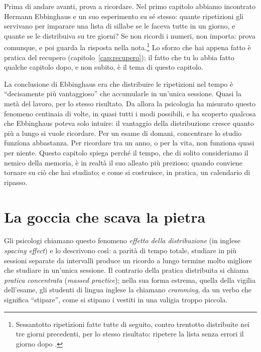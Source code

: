 Prima di andare avanti, prova a ricordare. Nel primo capitolo abbiamo
incontrato Hermann Ebbinghaus e un suo esperimento su sé stesso: quante
ripetizioni gli servivano per imparare una lista di sillabe se le faceva
tutte in un giorno, e quante se le distribuiva su tre giorni? Se non
ricordi i numeri, non importa: prova comunque, e poi guarda la
risposta nella nota.\footnote{Sessantotto ripetizioni fatte tutte di
seguito, contro trentotto distribuite nei tre giorni precedenti, per lo
stesso risultato: ripetere la lista senza errori il giorno dopo
\parencite{ebbinghaus1885}.} Lo sforzo che hai appena fatto è pratica
del recupero (capitolo~\ref{cap:recupero}); il fatto che tu lo abbia
fatto qualche capitolo dopo, e non subito, è il tema di questo
capitolo.

La conclusione di Ebbinghaus era che distribuire le ripetizioni nel
tempo è \enquote{decisamente più vantaggioso} che accumularle in
un'unica sessione. Quasi la metà del lavoro, per lo stesso risultato.
Da allora la psicologia ha misurato questo fenomeno centinaia di volte,
in quasi tutti i modi possibili, e ha scoperto qualcosa che Ebbinghaus
poteva solo intuire: il vantaggio della distribuzione cresce quanto più
a lungo si vuole ricordare. Per un esame di domani, concentrare lo
studio funziona abbastanza. Per ricordare tra un anno, o per la vita,
non funziona quasi per niente. Questo capitolo spiega perché il tempo,
che di solito consideriamo il nemico della memoria, è in realtà il suo
alleato più prezioso; quando conviene tornare su ciò che hai studiato;
e come si costruisce, in pratica, un calendario di ripasso.

\section{La goccia che scava la pietra}

Gli psicologi chiamano questo fenomeno \emph{effetto della
distribuzione} (in inglese \emph{spacing effect}) e lo descrivono così:
a parità di tempo totale, studiare in più sessioni separate da
intervalli produce un ricordo a lungo termine molto migliore che
studiare in un'unica sessione. Il contrario della pratica distribuita
si chiama \emph{pratica concentrata} (\emph{massed practice}); nella
sua forma estrema, quella della vigilia dell'esame, gli studenti di
lingua inglese la chiamano \emph{cramming}, da un verbo che significa
\enquote{stipare}, come si stipano i vestiti in una valigia troppo
piccola.

